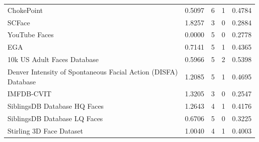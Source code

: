 \documentclass[journal]{IEEEtran}
\begin{document}
\begin{table}[!t]
\begin{tabular}{|p{}|C{0.11\textwidth}|C{0.11\textwidth}|C{0.11\textwidth}|C{0.11\textwidth}|}
ChokePoint \cite{wong2011patch}                                                         & 0.5097                           & 6                               & 1                                  & 0.4784                    \\
SCFace \cite{grgic2011scface}                                                           & 1.8257                           & 3                               & 0                                  & 0.2884                    \\
YouTube Faces \cite{wolf2011face}                                                       & 0.0000                           & 5                               & 0                                  & 0.2778                    \\
EGA \cite{riccio2012ega}                                                                & 0.7141                           & 5                               & 1                                  & 0.4365                    \\
10k US Adult Faces Database \cite{bainbridge2013intrinsic}                              & 0.5966                           & 5                               & 2                                  & 0.5398                    \\
Denver Intensity of Spontaneous Facial Action (DISFA) Database \cite{mavadati2013disfa} & 1.2085                           & 5                               & 1                                  & 0.4695                    \\
IMFDB-CVIT \cite{setty2013indian}                                                       & 1.3205                           & 3                               & 0                                  & 0.2547                    \\
SiblingsDB Database HQ Faces \cite{vieira2014detecting}                                 & 1.2643                           & 4                               & 1                                  & 0.4176                    \\
SiblingsDB Database LQ Faces \cite{vieira2014detecting}                                 & 0.6706                           & 5                               & 0                                  & 0.3225                    \\
Stirling 3D Face Dataset \cite{stirlingdb}                                              & 1.0040                           & 4                               & 1                                  & 0.4003                    \\

\end{tabular}
\end{table}
\end{document}
